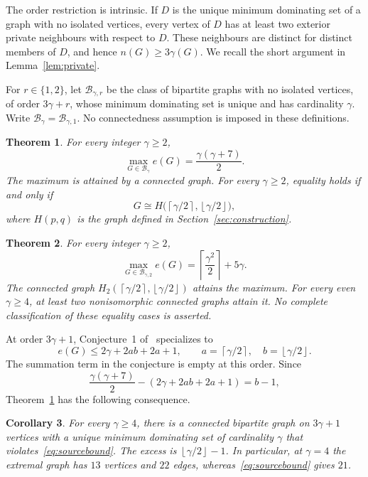 \documentclass[11pt]{article}
\newtheorem{theorem}{Theorem}[section]
\newtheorem{corollary}[theorem]{Corollary}
\theoremstyle{definition}
\theoremstyle{remark}
\newcommand{\e}{e}
\newcommand{\ceil}[1]{\left\lceil#1\right\rceil}
\newcommand{\floor}[1]{\left\lfloor#1\right\rfloor}
\begin{document}
The order restriction is intrinsic. If $D$ is the unique minimum dominating
set of a graph with no isolated vertices, every vertex of $D$ has at least two
exterior private neighbours with respect to $D$. These neighbours are distinct
for distinct members of $D$, and hence $n(G)\ge3\gamma(G)$. We recall the short
argument in Lemma~\ref{lem:private}.

For $r\in\{1,2\}$, let $\mathcal B_{\gamma,r}$ be the class of bipartite
graphs with no isolated vertices, of order $3\gamma+r$, whose minimum
dominating set is unique and has cardinality $\gamma$. Write
$\mathcal B_\gamma=\mathcal B_{\gamma,1}$. No connectedness assumption is
imposed in these definitions.

\begin{theorem}\label{thm:main}
For every integer $\gamma\ge2$,
\[
 \max_{G\in\mathcal B_\gamma}\e(G)=\frac{\gamma(\gamma+7)}2.
\]
The maximum is attained by a connected graph. For every $\gamma\ge2$, equality
holds if and only if
\[
 G\cong H\bigl(\ceil{\gamma/2},\floor{\gamma/2}\bigr),
\]
where $H(p,q)$ is the graph defined in Section~\ref{sec:construction}.
\end{theorem}

\begin{theorem}\label{thm:two}
For every integer $\gamma\ge2$,
\[
 \max_{G\in\mathcal B_{\gamma,2}}\e(G)
   =\ceil{\frac{\gamma^2}{2}}+5\gamma.
\]
The connected graph $H_2(\ceil{\gamma/2},\floor{\gamma/2})$ attains the maximum.
For every even $\gamma\ge4$, at least two nonisomorphic connected graphs
attain it. No complete classification of these equality cases is asserted.
\end{theorem}

At order $3\gamma+1$, Conjecture~1 of~\cite{KN} specializes to
\begin{equation}\label{eq:sourcebound}
 \e(G)\le 2\gamma+2ab+2a+1,
 \qquad a=\ceil{\gamma/2},\quad b=\floor{\gamma/2}.
\end{equation}
The summation term in the conjecture is empty at this order. Since
\begin{equation}\label{eq:gap}
 \frac{\gamma(\gamma+7)}2-(2\gamma+2ab+2a+1)=b-1,
\end{equation}
Theorem~\ref{thm:main} has the following consequence.

\begin{corollary}\label{cor:counter}
For every $\gamma\ge4$, there is a connected bipartite graph on $3\gamma+1$
vertices with a unique minimum dominating set of cardinality $\gamma$ that
violates~\eqref{eq:sourcebound}. The excess is $\floor{\gamma/2}-1$.
In particular, at $\gamma=4$ the extremal graph has $13$ vertices and $22$
edges, whereas~\eqref{eq:sourcebound} gives $21$.
\end{corollary}
\end{document}
